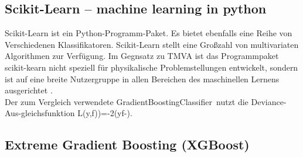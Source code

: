 \subsection{Scikit-Learn -- machine learning in python}
\label{ch:Algorithmen:subsec:sklearn}

Scikit-Learn ist ein Python-Programm-Paket. Es bietet ebenfalls eine Reihe von Verschiedenen Klassifikatoren. Scikit-Learn stellt eine Gro\ss zahl von multivariaten Algorithmen zur Verf\"ugung. Im Gegnsatz zu TMVA ist das Programmpaket scikit-kearn nicht speziell f\"ur physikalische Problemstellungen entwickelt, sondern ist auf eine breite Nutzergruppe in allen Bereichen des maschinellen Lernens ausgerichtet \cite{DBLP:journals/corr/abs-1201-0490}.\\
Der zum Vergleich verwendete \glqq GradientBoostingClassifier\grqq~nutzt die \glqq Deviance\grqq-Aus-gleichsfunktion
\beq
L\left(y,f)\right)=-2\left(y\cdot f-\right).
\label{eq:deviance}
\eeq

\subsection{Extreme Gradient Boosting (XGBoost)}
\label{ch:Algorithmen:subsec:XGB}

